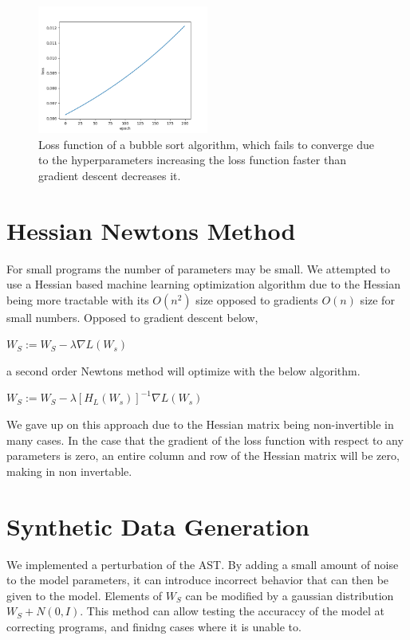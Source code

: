 \documentclass{article}
\begin{document}
\begin{figure}[h!]
  \begin{center}
    \includegraphics[width=0.5\textwidth]{bubble_sort.png}
  \end{center}
  \caption{Loss function of a bubble sort algorithm, which fails to converge due to the hyperparameters increasing the loss function faster than gradient descent decreases it.}
  \label{fig:bubble_sort}
\end{figure}
\section{Hessian Newtons Method}
For small programs the number of parameters may be small. We attempted to use a Hessian based machine learning optimization algorithm due to the Hessian being more tractable with its $O(n^2)$ size opposed to gradients $O(n)$ size for small numbers. Opposed to gradient descent below,

\begin{center}
  $W_S := W_S - \lambda \nabla L(W_s)$
\end{center}

a second order Newtons method will optimize with the below algorithm.
\begin{center}
  $W_S := W_S - \lambda [H_L(W_s)]^{-1} \nabla L(W_s)$
\end{center}

We gave up on this approach due to the Hessian matrix being non-invertible in many cases. In the case that the gradient of the loss function with respect to any parameters is zero, an entire column and row of the Hessian matrix will be zero, making in non invertable.

\section{Synthetic Data Generation}
We implemented a perturbation of the AST. By adding a small amount of noise to the model parameters, it can introduce incorrect behavior that can then be given to the model. Elements of $W_S$ can be modified by a gaussian distribution $W_S + N(0, I)$. This method can allow testing the accuraccy of the model at correcting programs, and finidng cases where it is unable to.
\end{document}
